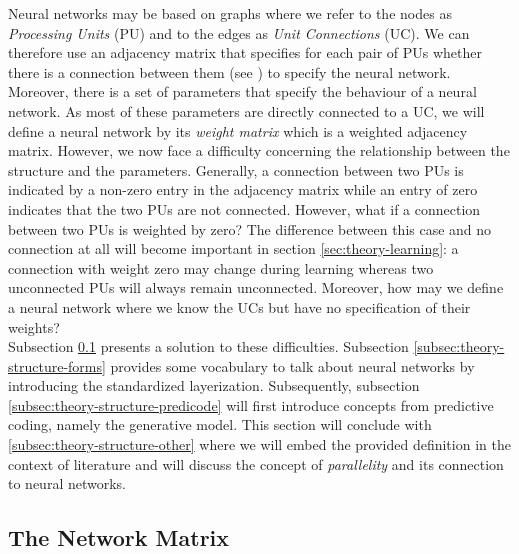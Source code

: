 \documentclass[a4paper,11pt]{report}
\begin{document}
\begin{Par}\label{theory-structure:intro}
Neural networks may be based on graphs where we refer to the nodes as \emph{Processing Units} (PU) and to the edges as \emph{Unit Connections} (UC). We can therefore use an adjacency matrix that specifies for each pair of PUs whether there is a connection between them (see ) to specify the neural network.\\
Moreover, there is a set of parameters that specify the behaviour of a neural network. As most of these parameters are directly connected to a UC, we will define a neural network by its \emph{weight matrix} which is a weighted adjacency matrix. However, we now face a difficulty concerning the relationship between the structure and the parameters. Generally, a connection between two PUs is indicated by a non-zero entry in the adjacency matrix while an entry of zero indicates that the two PUs are not connected. However, what if a connection between two PUs is weighted by zero? The difference between this case and no connection at all will become important in section \ref{sec:theory-learning}: a connection with weight zero may change during learning whereas two unconnected PUs will always remain unconnected. Moreover, how may we define a neural network where we know the UCs but have no specification of their weights?\\
Subsection \ref{subsec:theory-structure-matrix} presents a solution to these difficulties. Subsection \ref{subsec:theory-structure-forms} provides some vocabulary to talk about neural networks by introducing the standardized layerization. Subsequently, subsection \ref{subsec:theory-structure-predicode} will first introduce concepts from predictive coding, namely the generative model. This section will conclude with \ref{subsec:theory-structure-other} where we will embed the provided definition in the context of literature and will discuss the concept of \emph{parallelity} and its connection to neural networks.
\end{Par}

\subsection{The Network Matrix}\label{subsec:theory-structure-matrix}
\end{document}
